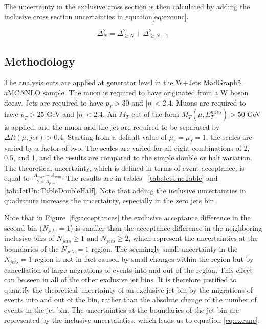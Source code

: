 \documentclass[oneside, letterpaper, oldfontcommands]{memoir}
\begin{document}
\qquad The uncertainty in the exclusive cross section is then calculated by adding the inclusive cross section uncertainties in equation\eqref{eq:excunc}.

\begin{equation}\label{eq:excunc}
\Delta_{N}^2 = \Delta_{\geq N}^2 + \Delta_{\geq N+1}^2
\end{equation}

\subsection{Methodology}
\label{application}

\qquad The analysis cuts are applied at generator level in the W+Jets {\sc MadGraph5$\_$aMC@NLO} sample. The muon is required to have originated from a W boson decay. Jets are required to have $p_{T} > 30$ and $|\eta| < 2.4$. Muons are required to have $p_{T} > 25$ GeV and $|\eta| < 2.4$. An $M_{T}$ cut of the form $M_{T}(\mu,E_{T}^{miss}) > 50$ GeV is applied, and the muon and the jet are required to be separated by $\Delta R(\mu,jet) > 0.4$. Starting from a default value of $\mu_{r} = \mu_{f} = 1$, the scales are varied by a factor of two. The scales are varied for all eight combinations of 2, 0.5, and 1, and the results are compared to the simple double or half variation.  The theoretical uncertainty, which is defined in terms of event acceptance, is equal to $\frac{|A_{max} - A_{min}|}{2 \times A_{\mu=1}}$  The results are in tables ~\ref{tab:JetUncTable} and \ref{tab:JetUncTableDoubleHalf}. Note that adding the inclusive uncertainties in quadrature increases the uncertainty, especially in the zero jets bin.

\qquad Note that in Figure~\ref{fig:acceptances} the exclusive acceptance difference in the second bin ($N_{jets}=1$) is smaller than the acceptance difference in the neighboring inclusive bins of $N_{jets} \geq 1$ and $N_{jets} \geq2$, which represent the uncertainties at the boundaries of the $N_{jets}=1$ region. The seemingly small uncertainty in the $N_{jets}=1$ region is not in fact caused by small changes within the region but by cancellation of large migrations of events into and out of the region. This effect can be seen in all of the other exclusive jet bins.
It is therefore justified to quantify the theoretical uncertainty of an exclusive jet bin by the migrations of events into and out of the bin, rather than the absolute change of the number of events in the jet bin. The uncertainties at the boundaries of the jet bin are represented by the inclusive uncertainties, which leads us to equation \eqref{eq:excunc}.
\end{document}
